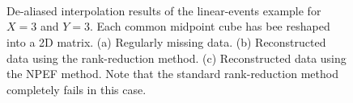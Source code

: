{%
%

\begin{figure}[htb!]
   \centering
   \\
   \\
   \\
\caption{De-aliased interpolation results of the linear-events example for $X=3$ and $Y=3$. Each common midpoint cube has bee reshaped into a 2D matrix. (a) Regularly missing data. (b) Reconstructed data using the rank-reduction method. (c) Reconstructed data using the NPEF method. Note that the standard rank-reduction method completely fails in this case.}
\label{fig:la_obs5d,la_drr5d,la_npef5d}
\end{figure}

}
